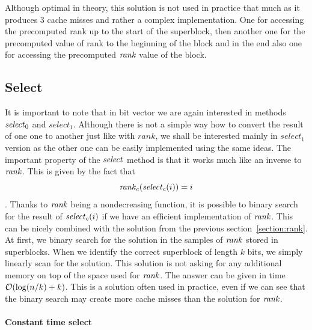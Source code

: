 Although optimal in theory, this solution is not used in practice that much as it produces
3 cache misses and rather a complex implementation. One for accessing the precomputed rank up
to the start of the superblock, then another one for the precomputed value of rank to the
beginning of the block and in the end also one for accessing the precomputed $\mathit{rank}$ value
of the block.


\subsection{Select}
\label{section:select}

It is important to note that in bit vector we are again interested in methods $\mathit{select}_0$
and $select_1$. Although there is not a simple way how to convert the result of one one to
another just like with $rank$, we shall be interested mainly in $select_1$ version as the
other one can be easily implemented using the same ideas. The important property of the
$\mathit{select}$ method is that it works much like an inverse to $\mathit{rank}$. This is given by the fact that
$$\mathit{rank}_c(\mathit{select}_c(i)) = i$$. Thanks to $\mathit{rank}$ being a nondecreasing function, it is possible
to binary search for the result of $\mathit{select}_c(i)$ if we have an efficient implementation of
$\mathit{rank}$. This can be nicely combined with the solution from the previous section~\ref{section:rank}.
At first, we binary search for the solution in the samples of $\mathit{rank}$ stored in superblocks. When we
identify the correct superblock of length $k$ bits, we simply linearly scan for the solution. This
solution is not asking for any additional memory on top of the space used for $\mathit{rank}$. The answer
can be given in time $\mathcal{O}(\log(n/k)+k)$. This is a solution often used in practice, even if we
can see that the binary search may create more cache misses than the solution for $\mathit{rank}$.

\paragraph{Constant time select}

